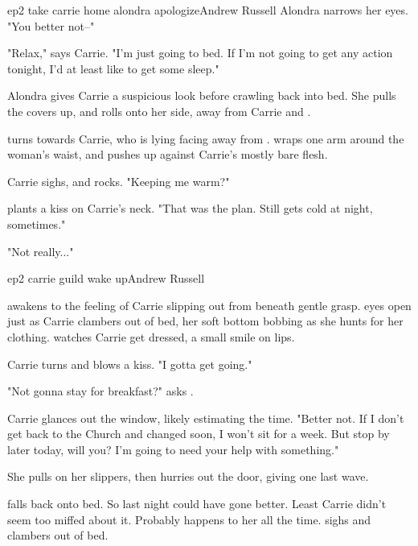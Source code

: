 \documentclass{book}
\begin{document}
\begin{childnode}{ep2 take carrie home alondra apologize}{Andrew Russell}
    Alondra narrows her eyes. "You better not--"

    "Relax," says Carrie. "I'm just going to bed. If I'm not going to get any action tonight, I'd at least like to get some sleep."

    Alondra gives Carrie a suspicious look before crawling back into bed. She pulls the covers up, and rolls onto her side, away from Carrie and \name{}.

    \name{} turns towards Carrie, who is lying facing away from \name{}. \name{} wraps one arm around the woman's waist, and pushes \himselfherself{} up against Carrie's mostly bare flesh.

    Carrie sighs, and rocks. "Keeping me warm?"

    \name{} plants a kiss on Carrie's neck. "That was the plan. Still gets cold at night, sometimes."

    "Not really..."

    

\end{childnode}

\begin{childnode}{ep2 carrie guild wake up}{Andrew Russell}

    \name{} awakens to the feeling of Carrie slipping out from beneath \hisher{} gentle grasp. \HisHer{} eyes open just as Carrie clambers out of bed, her
    soft bottom bobbing as she hunts for her clothing. \name{} watches Carrie get dressed, a small smile on \hisher{} lips.

    Carrie turns and blows \name{} a kiss. "I gotta get going."

    "Not gonna stay for breakfast?" asks \name{}.

    Carrie glances out the window, likely estimating the time. "Better not. If I don't get back to the Church and changed soon, I won't sit for a week. But stop by later today, will you? I'm going
    to need your help with something."

    She pulls on her slippers, then hurries out the door, giving \name{} one last wave.

    \name{} falls back onto \hisher{} bed. So last night could have gone better. Least Carrie didn't seem too miffed about it. Probably 
    happens to her all the time. \name{} sighs and clambers out of bed.    

\end{childnode}
\end{document}
